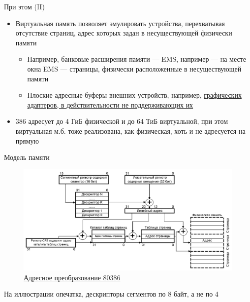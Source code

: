 \documentclass[xetex,aspectratio=43]{beamer}
\begin{document}
\begin{frame}{При этом (II)}
    \begin{itemize}
        \tightlist
        \item
        Виртуальная память позволяет эмулировать устройства, перехватывая
        отсутствие страниц, адрес которых задан в несуществующей физически
        памяти

        \begin{itemize}
            \tightlist
            \item
            Например, банковые расширения памяти --- EMS, например --- на месте
            окна EMS --- страницы, физически расположенные в несуществующей
            памяти
            \item
            Плоские адресные буферы внешних устройств, например,
            \href{http://ru.wikipedia.org/wiki/UniVBE}{графических адаптеров, в
                действительности не поддерживающих их}
        \end{itemize}
        \item
        386 адресует до 4 ГиБ физической и до 64 ТиБ виртуальной, при этом
        виртуальная м.б. тоже реализована, как физическая, хоть и не
        адресуется на прямую
    \end{itemize}
\end{frame}

\begin{frame}{Модель памяти}
    \begin{figure}
        \includegraphics[height=0.8\textheight]{img/06.I8386_Addres_Translation.png}
        \caption{\href{https://en.wikipedia.org/wiki/Protected_mode}{Адресное преобразование 80386}}
    \end{figure}

    На иллюстрации опечатка, дескрипторы сегментов по 8 байт, а не по 4
\end{frame}
\end{document}
